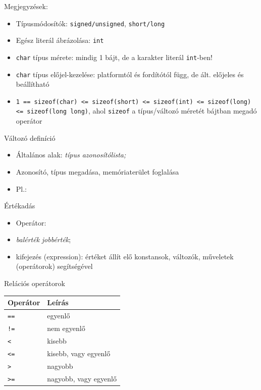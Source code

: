 \documentclass[usenames,dvipsnames,aspectratio=169]{beamer}
\begin{document}
\begin{frame}
  Megjegyzések:
  \begin{itemize}
    \item Típusmódosítók: \texttt{signed/unsigned}, \texttt{short/long}
    \item Egész literál ábrázolása: \texttt{int}
    \item \texttt{char} típus mérete: mindig 1 bájt, de a karakter literál \texttt{int}-ben!
    \item \texttt{char} típus előjel-kezelése: platformtól és fordítótól függ, de ált. előjeles és beállítható
    \item \texttt{1 == sizeof(char) <= sizeof(short) <= sizeof(int) <= sizeof(long) <= sizeof(long long)}, ahol \texttt{sizeof} 
a típus/változó méretét bájtban megadó operátor
  \end{itemize}
\end{frame}

\begin{frame}
  Változó definíció
  \begin{itemize}
    \item Általános alak: \emph{típus azonosítólista;}
    \item Azonosító, típus megadása, memóriaterület foglalása
    \item Pl.: 
  \end{itemize}
  \vfill
  Értékadás
  \begin{itemize}
    \item Operátor: \kiemel{=}
    \item \emph{balérték} \kiemel{=} \emph{jobbérték};
    \item kifejezés (expression): értéket állít elő konstansok, változók, műveletek (operátorok) segítségével
  \end{itemize}
\end{frame}

\begin{frame}
  Relációs operátorok
  \begin{center}
    \begin{tabular}{ll}
      Operátor & Leírás \\ \hline
      \texttt{==} & egyenlő \\
      \texttt{!=} & nem egyenlő \\
      \texttt{<} & kisebb \\
      \texttt{<=} & kisebb, vagy egyenlő \\
      \texttt{>} & nagyobb \\
      \texttt{>=} & nagyobb, vagy egyenlő \\
    \end{tabular}
  \end{center}
\end{frame}
\end{document}
